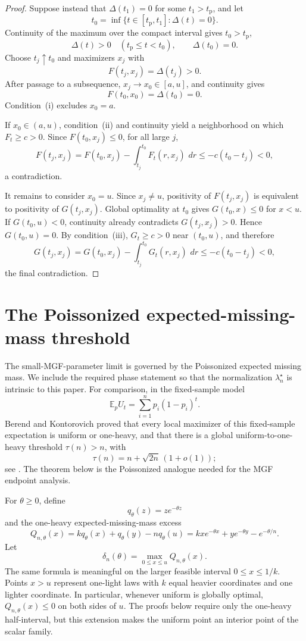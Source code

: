 \documentclass[11pt]{article}
\theoremstyle{plain}
\theoremstyle{definition}
\theoremstyle{remark}
\newcommand{\E}{\mathbb E}
\newcommand{\dd}{\,d}
\begin{document}
\begin{proof}
Suppose instead that \(\Delta(t_1)=0\) for some \(t_1>t_{\mathrm p}\), and let
\[
t_0=\inf\{t\in[t_{\mathrm p},t_1]:\Delta(t)=0\}.
\]
Continuity of the maximum over the compact interval gives \(t_0>t_{\mathrm p}\),
\[
\Delta(t)>0\quad(t_{\mathrm p}\le t<t_0),
\qquad
\Delta(t_0)=0.
\]
Choose \(t_j\uparrow t_0\) and maximizers \(x_j\) with
\[
F(t_j,x_j)=\Delta(t_j)>0.
\]
After passage to a subsequence, \(x_j\to x_0\in[a,u]\), and continuity gives
\[
F(t_0,x_0)=\Delta(t_0)=0.
\]
Condition~\textup{(i)} excludes \(x_0=a\).

If \(x_0\in(a,u)\), condition~\textup{(ii)} and continuity yield a neighborhood on which \(F_t\ge c>0\).  Since \(F(t_0,x_j)\le0\), for all large \(j\),
\[
F(t_j,x_j)
=F(t_0,x_j)-\int_{t_j}^{t_0}F_t(r,x_j)\,\dd r
\le-c(t_0-t_j)<0,
\]
a contradiction.

It remains to consider \(x_0=u\).  Since \(x_j\ne u\), positivity of \(F(t_j,x_j)\) is equivalent to positivity of \(G(t_j,x_j)\).  Global optimality at \(t_0\) gives \(G(t_0,x)\le0\) for \(x<u\).  If \(G(t_0,u)<0\), continuity already contradicts \(G(t_j,x_j)>0\).  Hence \(G(t_0,u)=0\).  By condition~\textup{(iii)}, \(G_t\ge c>0\) near \((t_0,u)\), and therefore
\[
G(t_j,x_j)
=G(t_0,x_j)-\int_{t_j}^{t_0}G_t(r,x_j)\,\dd r
\le-c(t_0-t_j)<0,
\]
the final contradiction.
\end{proof}

\section{The Poissonized expected-missing-mass threshold}\label{sec:expected-threshold}

The small-MGF-parameter limit is governed by the Poissonized expected missing mass.  We include the required phase statement so that the normalization \(\lambda_n^\star\) is intrinsic to this paper.  For comparison, in the fixed-sample model
\[
\E_p U_t=\sum_{i=1}^n p_i(1-p_i)^t.
\]
Berend and Kontorovich proved that every local maximizer of this fixed-sample expectation is uniform or one-heavy, and that there is a global uniform-to-one-heavy threshold \(\tau(n)>n\), with
\[
\tau(n)=n+\sqrt{2n}\,(1+o(1));
\]
see \cite[Theorem~5]{BerendKontorovich2012}.  The theorem below is the Poissonized analogue needed for the MGF endpoint analysis.

For \(\theta\ge0\), define
\[
q_\theta(z)=z e^{-\theta z}
\]
and the one-heavy expected-missing-mass excess
\begin{equation}\label{eq:Q-def}
Q_{n,\theta}(x)=kq_\theta(x)+q_\theta(y)-nq_\theta(u)
=kx e^{-\theta x}+y e^{-\theta y}-e^{-\theta/n}.
\end{equation}
Let
\[
\delta_n(\theta)=\max_{0\le x\le u}Q_{n,\theta}(x).
\]
The same formula is meaningful on the larger feasible interval \(0\le x\le1/k\).  Points \(x>u\) represent one-light laws with \(k\) equal heavier coordinates and one lighter coordinate.  In particular, whenever uniform is globally optimal, \(Q_{n,\theta}(x)\le0\) on both sides of \(u\).  The proofs below require only the one-heavy half-interval, but this extension makes the uniform point an interior point of the scalar family.
\end{document}
